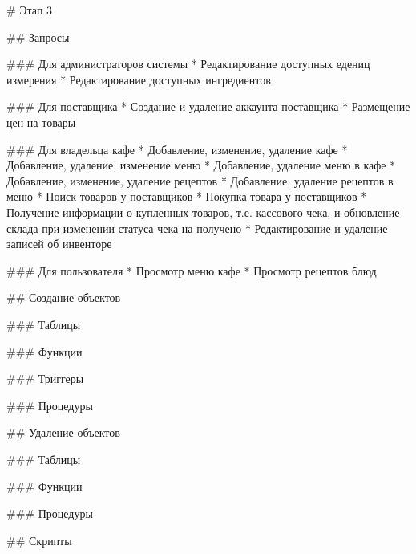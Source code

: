 \begin{markdown}
# Этап 3

## Запросы

### Для администраторов системы
* Редактирование доступных едениц измерения
* Редактирование доступных ингредиентов

### Для поставщика
* Создание и удаление аккаунта поставщика
* Размещение цен на товары

### Для владельца кафе
* Добавление, изменение, удаление кафе 
* Добавление, удаление, изменение меню
* Добавление, удаление меню в кафе
* Добавление, изменение, удаление рецептов
* Добавление, удаление рецептов в меню
* Поиск товаров у поставщиков
* Покупка товара у поставщиков
* Получение информации о купленных товаров, т.е. кассового чека, и обновление склада при изменении статуса чека на получено
* Редактирование и удаление записей об инвенторе

### Для пользователя
* Просмотр меню кафе
* Просмотр рецептов блюд

## Создание объектов

### Таблицы
\end{markdown}


\begin{markdown}
### Функции
\end{markdown}


\begin{markdown}
### Триггеры
\end{markdown}


\begin{markdown}
### Процедуры
\end{markdown}


\begin{markdown}
## Удаление объектов

### Таблицы
\end{markdown}


\begin{markdown}
### Функции
\end{markdown}


\begin{markdown}
### Процедуры
\end{markdown}


\begin{markdown}
## Скрипты
\end{markdown}

